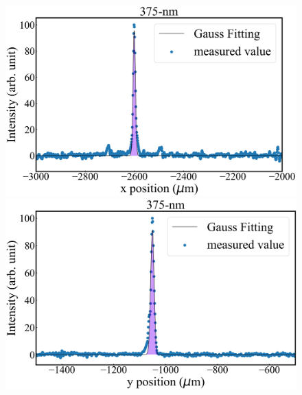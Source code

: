 \begin{figure}[h]
	\begin{center}
	\begin{minipage}{0.48\linewidth}
	\begin{center}
			\includegraphics[width = 0.98\columnwidth]{./experimental_setup/figure/375GaussianFittingXpos.jpg}
	\end{center}
	\end{minipage}
	\begin{minipage}{0.48\linewidth}
	\begin{center}
			\includegraphics[width=0.98\columnwidth]{./experimental_setup/figure/375GaussianFittingYpos.jpg}
	\end{center}
	\end{minipage}
	\begin{minipage}{0.48\linewidth}
	\begin{center}

\end{center}
\end{minipage}
\end{center}
\end{figure}
